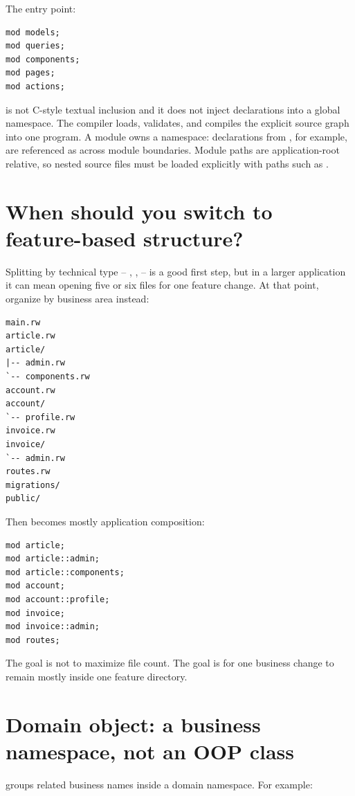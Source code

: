 The entry point:

\begin{lstlisting}[language=RWLang]
mod models;
mod queries;
mod components;
mod pages;
mod actions;
\end{lstlisting}

 is not C-style textual inclusion and it does not inject declarations into a global namespace. The compiler loads, validates, and compiles the explicit source graph into one program. A module owns a namespace: declarations from , for example, are referenced as  across module boundaries. Module paths are application-root relative, so nested source files must be loaded explicitly with paths such as .

\section{When should you switch to feature-based structure?}

Splitting by technical type -- , ,  -- is a good first step, but in a larger application it can mean opening five or six files for one feature change. At that point, organize by business area instead:

\begin{lstlisting}
main.rw
article.rw
article/
|-- admin.rw
`-- components.rw
account.rw
account/
`-- profile.rw
invoice.rw
invoice/
`-- admin.rw
routes.rw
migrations/
public/
\end{lstlisting}

Then  becomes mostly application composition:

\begin{lstlisting}[language=RWLang]
mod article;
mod article::admin;
mod article::components;
mod account;
mod account::profile;
mod invoice;
mod invoice::admin;
mod routes;
\end{lstlisting}

The goal is not to maximize file count. The goal is for one business change to remain mostly inside one feature directory.

\section{Domain object: a business namespace, not an OOP class}

 groups related business names inside a domain namespace. For example:

